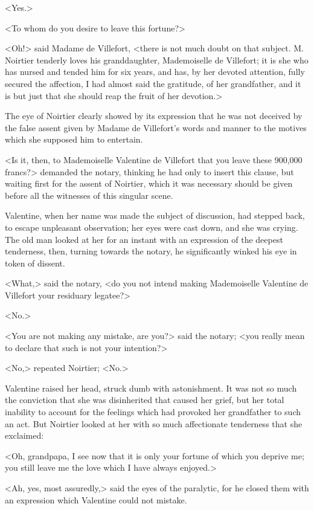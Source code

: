  <Yes.> 

 <To whom do you desire to leave this fortune?> 

 <Oh!> said Madame de Villefort, <there is not much doubt on that subject. M. Noirtier tenderly loves his granddaughter, Mademoiselle de Villefort; it is she who has nursed and tended him for six years, and has, by her devoted attention, fully secured the affection, I had almost said the gratitude, of her grandfather, and it is but just that she should reap the fruit of her devotion.> 

 The eye of Noirtier clearly showed by its expression that he was not deceived by the false assent given by Madame de Villefort's words and manner to the motives which she supposed him to entertain. 

 <Is it, then, to Mademoiselle Valentine de Villefort that you leave these 900,000 francs?> demanded the notary, thinking he had only to insert this clause, but waiting first for the assent of Noirtier, which it was necessary should be given before all the witnesses of this singular scene. 

 Valentine, when her name was made the subject of discussion, had stepped back, to escape unpleasant observation; her eyes were cast down, and she was crying. The old man looked at her for an instant with an expression of the deepest tenderness, then, turning towards the notary, he significantly winked his eye in token of dissent. 

 <What,> said the notary, <do you not intend making Mademoiselle Valentine de Villefort your residuary legatee?> 

 <No.> 

 <You are not making any mistake, are you?> said the notary; <you really mean to declare that such is not your intention?> 

 <No,> repeated Noirtier; <No.> 

 Valentine raised her head, struck dumb with astonishment. It was not so much the conviction that she was disinherited that caused her grief, but her total inability to account for the feelings which had provoked her grandfather to such an act. But Noirtier looked at her with so much affectionate tenderness that she exclaimed: 

 <Oh, grandpapa, I see now that it is only your fortune of which you deprive me; you still leave me the love which I have always enjoyed.> 

 <Ah, yes, most assuredly,> said the eyes of the paralytic, for he closed them with an expression which Valentine could not mistake. 

